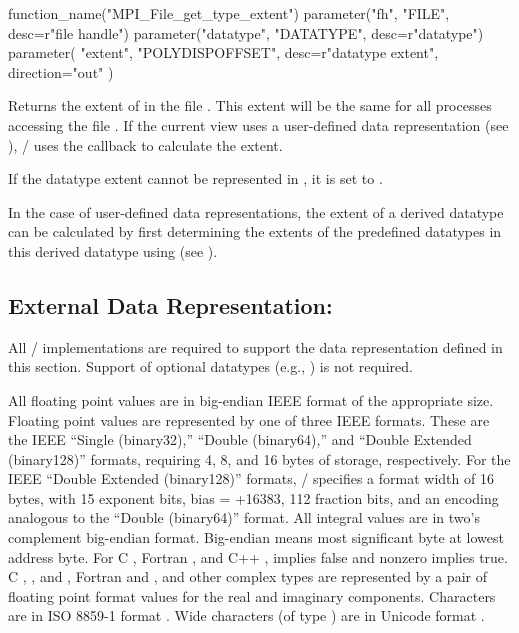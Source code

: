 %
%
\begin{mpi-binding}
    function_name("MPI_File_get_type_extent")
    parameter("fh", "FILE", desc=r"file handle")
    parameter("datatype", "DATATYPE", desc=r"datatype")
    parameter(
        "extent", "POLYDISPOFFSET", desc=r"datatype extent", direction="out"
    )
\end{mpi-binding}

Returns the extent of  in the file .
This extent will be the same for all processes accessing 
the file .
If the current view uses a user-defined data representation
(see ),
\MPI/ uses the  callback
to calculate the extent.

If the datatype extent cannot be represented in ,
it is set to .

\begin{implementors}
In the case of user-defined data representations,
the extent of a derived datatype can be calculated  
by first determining the extents of the predefined datatypes
in this derived datatype using 
(see ).
\end{implementors}

\subsection{External Data Representation: \texorpdfstring{}{external32}}
\label{subsec:ext32}
All \MPI/ implementations are required to support the data representation
defined in this section.  
Support of optional datatypes (e.g., )
is not required.

All floating point values are in big-endian
IEEE format \cite{ieee-754-2008} of the appropriate size.
Floating point values are represented by one
of three IEEE formats. 
 These are the IEEE ``Single (binary32),'' ``Double (binary64),'' and 
``Double Extended (binary128)'' formats, requiring 4, 8, and 16 bytes of storage, 
respectively. 
For the IEEE ``Double Extended (binary128)'' formats, \MPI/ specifies a
format width of 16 bytes, with 15 exponent bits, 
bias = +16383,
112 fraction bits, and an encoding analogous to the ``Double (binary64)'' format. 
All integral values are in two's complement big-endian format.
Big-endian means most significant byte at lowest address byte.
 For C , Fortran , and C++ ,
  implies false and nonzero implies true. 
 C , , and , 
 Fortran  and , and other complex
 types are represented
 by a pair of floating point
 format values for the real and imaginary components.
Characters are in ISO 8859-1 format \cite{ISO-8859-1}.
Wide characters (of type )
are in Unicode format \cite{UNICODE}.

